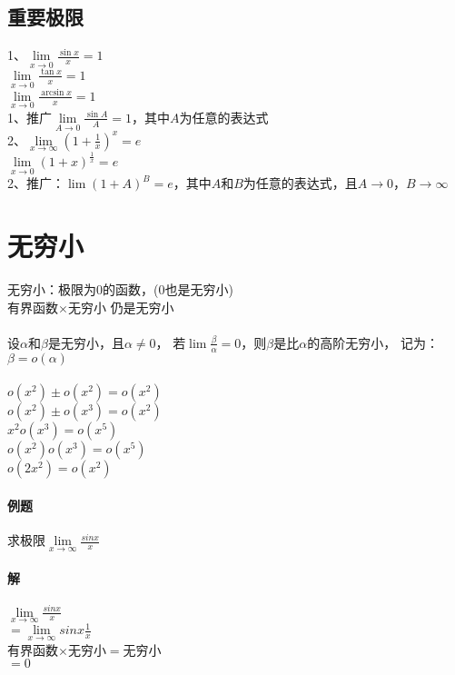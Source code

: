 \documentclass{article}
\begin{document}
\begin{flushleft}
	\subsection{重要极限}
	1、$\lim\limits_{x\to 0} \frac{\sin x}{x}=1$\\
	\qquad $\lim\limits_{x\to 0} \frac{\tan x}{x}=1$\\
	\qquad $\lim\limits_{x\to 0} \frac{\arcsin x}{x}=1$\\
	1、推广$\lim\limits_{A\to 0} \frac{\sin A}{A}=1$，其中$A$为任意的表达式\\
	2、$\lim\limits_{x\to \infty} (1+\frac{1}{x})^x=e$\\
	\qquad $\lim\limits_{x\to 0} (1+x)^{\frac{1}{x}}=e$\\
	2、推广：$\lim (1+A)^{B}=e$，其中$A$和$B$为任意的表达式，且$A\to 0$，$B\to\infty$\\
	
	\section{无穷小}
	
	无穷小：极限为0的函数，(0也是无穷小)\\
	有界函数$\times$无穷小 仍是无穷小\\
	~\\
	设$\alpha$和$\beta$是无穷小，且$\alpha \neq 0$，
	若$\lim \frac{\beta}{\alpha}=0$，则$\beta$是比$\alpha$的高阶无穷小，
	记为：$\beta = o(\alpha)$\\
	~\\
	$o(x^2)\pm o(x^2)=o(x^2)$\\
	$o(x^2)\pm o(x^3)=o(x^2)$\\
	$x^2 o(x^3)=o(x^5)$\\
	$o(x^2) o(x^3)=o(x^5)$\\
	$o(2x^2)=o(x^2)$\\
	
	\paragraph{例题}
	求极限$\lim\limits_{x\to \infty}\frac{sinx}{x}$
	\paragraph{解}
	$\lim\limits_{x\to \infty}\frac{sinx}{x}$\\
	$=\lim\limits_{x\to \infty}sinx\frac{1}{x}$\\
	有界函数$\times$无穷小$=$无穷小\\
	$=0$\\
	

\end{flushleft}
\end{document}
